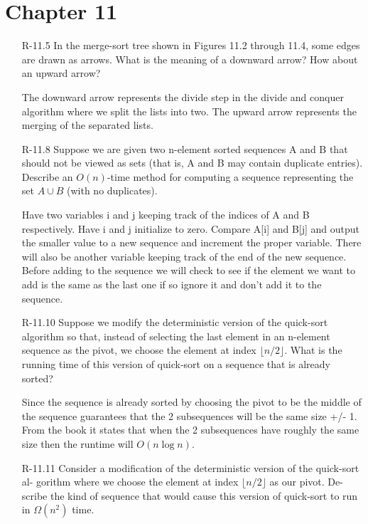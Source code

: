 \section{Chapter 11}

\begin{itemize}
    \item[R-11.5] In the merge-sort tree shown in Figures 11.2 through 11.4, some edges are
          drawn as arrows. What is the meaning of a downward arrow? How about
          an upward arrow?

          \answer The downward arrow represents the divide step in the divide and conquer algorithm
          where we split the lists into two. The upward arrow represents the merging of the separated
          lists.

    \item[R-11.8]  Suppose we are given two n-element sorted sequences A and B that should
          not be viewed as sets (that is, A and B may contain duplicate entries).
          Describe an $O(n)$-time method for computing a sequence representing the
          set $A \cup B$ (with no duplicates).

          \answer Have two variables i and j keeping track of the indices of A and B respectively.
          Have i and j initialize to zero. Compare A[i] and B[j] and output the smaller value to
          a new sequence and increment the proper variable. There will also be another variable
          keeping track of the end of the new sequence. Before adding to the sequence we will check
          to see if the element we want to add is the same as the last one if so ignore it and don't
          add it to the sequence.

    \item[R-11.10] Suppose we modify the deterministic version of the quick-sort algorithm
          so that, instead of selecting the last element in an n-element sequence as
          the pivot, we choose the element at index $\lfloor n/2 \rfloor$. What is the running time
          of this version of quick-sort on a sequence that is already sorted?

          \answer Since the sequence is already sorted by choosing the pivot to be the middle of the sequence
          guarantees that the 2 subsequences will be the same size +/- 1. From the book it states that when
          the 2 subsequences have roughly the same size then the runtime will $O(n\log n)$.

    \item[R-11.11] Consider a modification of the deterministic version of the quick-sort al-
          gorithm where we choose the element at index  $\lfloor n/2 \rfloor$ as our pivot. De-
          scribe the kind of sequence that would cause this version of quick-sort to
          run in $\Omega(n^2)$ time.


\end{itemize}
